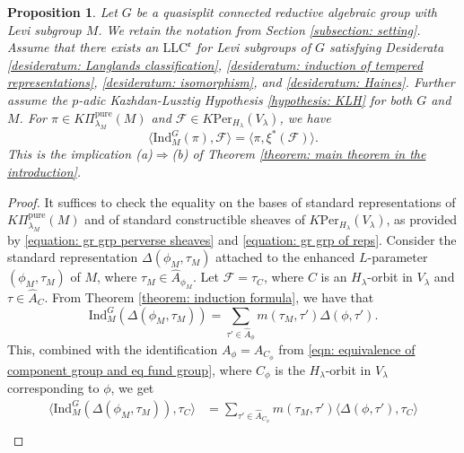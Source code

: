 \documentclass[11pt,letterpaper]{amsart}
\newcommand{\irrepdual}[1]{\widehat{#1}}
\newcommand{\pure}{\mathrm{pure}}
\newcommand{\Ind}{\mathrm{Ind}}
\newcommand{\LLC}{\mathrm{LLC}}
\newcommand{\Per}{\mathrm{Per}}
\newcommand{\stsh}[2]{{#1}_{#2}}
\newtheorem{prop}[thm]{Proposition}
\renewcommand{\1}{\mathbbm{1}}
\numberwithin{equation}{section}
\begin{document}
{%

\begin{prop}\label{proposition: pure parabolic induction and restriction}
    Let $G$ be a quasisplit connected reductive algebraic group with Levi subgroup $M$. We retain the notation from Section \ref{subsection: setting}. Assume that there exists an $\LLC^{\mathfrak{e}}$ for Levi subgroups of $G$ satisfying Desiderata \ref{desideratum: Langlands classification}, \ref{desideratum: induction of tempered representations}, \ref{desideratum: isomorphism}, and \ref{desideratum: Haines}. Further assume the $p$-adic Kazhdan-Lusztig Hypothesis \ref{hypothesis: KLH} for both $G$ and $M$. For $\pi\in K\Pi_{\lambda_M}^\pure(M)$ and $\mathcal{F}\in K\Per_{H_\lambda}(V_\lambda)$, we have
    \begin{equation}\label{equation: ind res adjunction}\langle \Ind_M^G(\pi),\mathcal{F}\rangle = \langle \pi,\xi^*(\mathcal{F})\rangle {.}\end{equation}
{This is the implication \textup{(a)}$\Rightarrow$\textup{(b)} of Theorem \ref{theorem: main theorem in the introduction}.}
\end{prop}
\begin{proof}
    It suffices to check the equality on the bases of standard representations of $K\Pi_{\lambda_M}^\pure(M)$ and of standard constructible sheaves of $K\Per_{H_\lambda}(V_\lambda)$, as provided by \eqref{equation: gr grp perverse sheaves} and \eqref{equation: gr grp of reps}. Consider the standard representation $\Delta(\phi_M,\tau_M)$ attached to the enhanced $L$-parameter $(\phi_M,\tau_M)$ of $M$, where $\tau_M\in \irrepdual{A}_{\phi_{M}}$. Let $\mathcal{F}=\stsh{\tau}{C}$, where $C$ is an $H_\lambda$-orbit in $V_\lambda$ and $\tau \in \irrepdual{A}_C$. From Theorem \ref{theorem: induction formula}, we have that 
    \[\Ind_{M}^{G} (\Delta(\phi_M,\tau_M))=\sum_{\tau' \in \widehat{A}_{\phi}} m(\tau_M, \tau') \Delta(\phi, \tau').\]
    This, combined with the identification $A_\phi=A_{C_\phi}$ from \eqref{eqn: equivalence of component group and eq fund group}, where $C_\phi$ is the $H_\lambda$-orbit in $V_\lambda$ corresponding to $\phi$, we get  
    \begin{align*}
    {\langle\Ind_M^G(\Delta(\phi_M,\tau_M)),\stsh{\tau}{C}\rangle}
        &=   \displaystyle \sum_{\tau' \in \widehat{A}_{C_\phi}} m(\tau_M, \tau')\langle \Delta(\phi, \tau'), \stsh{\tau}{C}\rangle \\

\end{align*}
\end{proof}}
\end{document}
